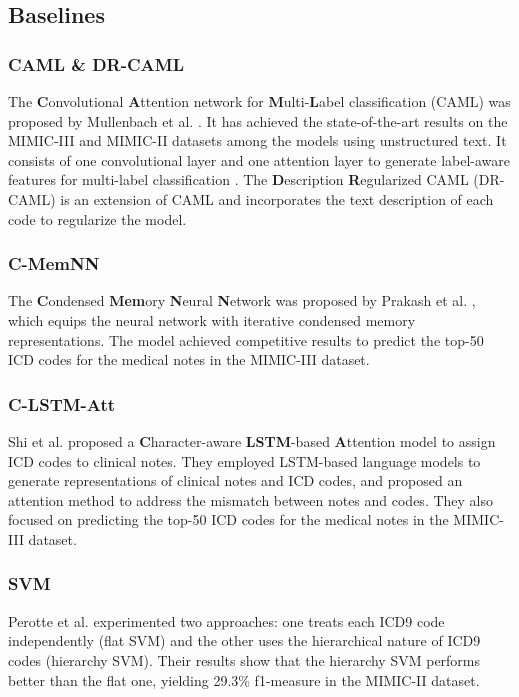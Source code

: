 \documentclass[letterpaper]{article} \usepackage{aaai20}  \usepackage{times}  \usepackage{helvet} \usepackage{courier}  \usepackage[hyphens]{url}  \usepackage{graphicx} \urlstyle{rm} \def\UrlFont{\rm}  \usepackage{graphicx}  \frenchspacing  \setlength{\pdfpagewidth}{8.5in}  \setlength{\pdfpageheight}{11in}
\begin{document}
\subsection{Baselines}

\subsubsection{CAML \& DR-CAML}
The \textbf{C}onvolutional \textbf{A}ttention network for \textbf{M}ulti-\textbf{L}abel classification (CAML) was proposed by Mullenbach et al. . It has achieved the state-of-the-art results on the MIMIC-III and MIMIC-II datasets among the models using unstructured text. It consists of one convolutional layer and one attention layer to generate label-aware features for multi-label classification \cite{mccallum1999multi}. The \textbf{D}escription \textbf{R}egularized CAML (DR-CAML) is an extension of CAML and incorporates the text description of each code to regularize the model.


\subsubsection{C-MemNN}
The \textbf{C}ondensed \textbf{Mem}ory \textbf{N}eural \textbf{N}etwork was proposed by Prakash et al. , which equips the neural network with iterative condensed memory representations. The model achieved competitive results to predict the top-50 ICD codes for the medical notes in the MIMIC-III dataset.


\subsubsection{C-LSTM-Att}
Shi et al.  proposed a \textbf{C}haracter-aware \textbf{LSTM}-based \textbf{A}ttention model to assign ICD codes to clinical notes. They employed LSTM-based language models to generate representations of clinical notes and ICD codes, and proposed an attention method to address the mismatch between notes and codes. They also focused on predicting the top-50 ICD codes for the medical notes in the MIMIC-III dataset.


\subsubsection{SVM}
Perotte et al.  experimented two approaches: one treats each ICD9 code independently (flat SVM) and the other uses the hierarchical nature of ICD9 codes (hierarchy SVM). Their results show that the hierarchy SVM performs better than the flat one, yielding 29.3\% f1-measure in the MIMIC-II dataset.
\end{document}
